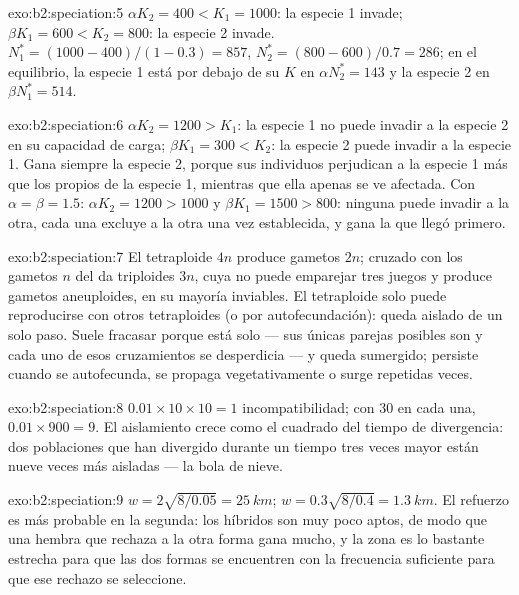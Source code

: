 \begin{solution}{exo:b2:speciation:5}
$\alpha K_2 = 400 < K_1 = 1000$: la especie 1 invade; $\beta K_1 = 600
< K_2 = 800$: la especie 2 invade. $N_1^{*} = (1000 - 400)/(1 - 0.3) =
857$, $N_2^{*} = (800 - 600)/0.7 = 286$; en el equilibrio, la especie
1 está por debajo de su $K$ en $\alpha N_2^{*} = 143$ y la especie 2 en $\beta
N_1^{*} = 514$.
\end{solution}

\begin{solution}{exo:b2:speciation:6}
$\alpha K_2 = 1200 > K_1$: la especie 1 no puede invadir a la especie 2 en
su capacidad de carga; $\beta K_1 = 300 < K_2$: la especie 2 puede invadir
a la especie 1. Gana siempre la especie 2, porque sus individuos
perjudican a la especie 1 más que los propios de la especie 1, mientras
que ella apenas se ve afectada. Con $\alpha = \beta = 1.5$: $\alpha K_2 = 1200 > 1000$
y $\beta K_1 = 1500 > 800$: ninguna puede invadir a la otra, cada una
excluye a la otra una vez establecida, y gana la que llegó primero.
\end{solution}

\begin{solution}{exo:b2:speciation:7}
El tetraploide $4n$ produce gametos $2n$; cruzado con los gametos $n$ del
 da triploides $3n$, cuya  no puede emparejar tres juegos y
produce gametos aneuploides, en su mayoría inviables. El tetraploide solo
puede reproducirse con otros tetraploides (o por autofecundación): queda
aislado de un solo paso. Suele fracasar porque está solo --- sus únicas
parejas posibles son  y cada uno de esos cruzamientos se
desperdicia --- y queda sumergido; persiste cuando se autofecunda, se
propaga vegetativamente o surge repetidas veces.
\end{solution}

\begin{solution}{exo:b2:speciation:8}
$0.01\times 10\times 10 = 1$ incompatibilidad; con 30 en cada una, $0.01\times
900 = 9$. El aislamiento crece como el cuadrado del tiempo de divergencia:
dos poblaciones que han divergido durante un tiempo tres veces mayor están
nueve veces más aisladas --- la bola de nieve.
\end{solution}

\begin{solution}{exo:b2:speciation:9}
$w = 2\sqrt{8/0.05} = \qty{25}{km}$; $w = 0.3\sqrt{8/0.4} =
\qty{1.3}{km}$. El refuerzo es más probable en la segunda: los híbridos
son muy poco aptos, de modo que una hembra que rechaza a la otra forma
gana mucho, y la zona es lo bastante estrecha para que las dos formas se
encuentren con la frecuencia suficiente para que ese rechazo se
seleccione.
\end{solution}

